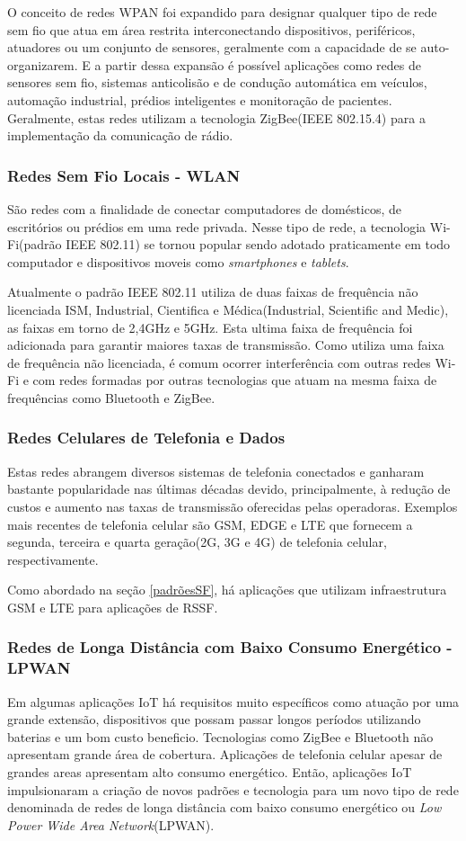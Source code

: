 O conceito de redes WPAN foi expandido para designar qualquer tipo de rede sem fio que atua em área restrita interconectando dispositivos, periféricos, atuadores ou um conjunto de sensores, geralmente com a capacidade de se auto-organizarem. E a partir dessa expansão é possível aplicações como redes de sensores sem fio, sistemas anticolisão e de condução automática em veículos, automação industrial, prédios inteligentes e monitoração de pacientes. Geralmente, estas redes utilizam a tecnologia ZigBee(IEEE 802.15.4) para a implementação da comunicação de rádio.

\subsubsection*{Redes Sem Fio Locais - WLAN}
São redes com a finalidade de conectar computadores de domésticos, de escritórios ou prédios em uma rede privada. Nesse tipo de rede, a tecnologia Wi-Fi(padrão IEEE 802.11) se tornou popular sendo adotado praticamente em todo computador e dispositivos moveis como \emph{smartphones} e \emph{tablets}.

Atualmente o padrão IEEE 802.11 utiliza de duas faixas de frequência não licenciada ISM, Industrial, Cientifica e Médica(Industrial, Scientific and Medic), as faixas em torno de 2,4GHz e 5GHz. Esta ultima faixa de frequência foi adicionada para garantir maiores taxas de transmissão. Como utiliza uma faixa de frequência não licenciada, é comum ocorrer interferência com outras redes Wi-Fi e com redes formadas por outras tecnologias que atuam na mesma faixa de frequências como Bluetooth e ZigBee.

\subsubsection*{Redes Celulares de Telefonia e Dados}
Estas redes abrangem diversos sistemas de telefonia conectados e ganharam bastante popularidade nas últimas décadas devido, principalmente, à redução de custos e aumento nas taxas de transmissão oferecidas pelas operadoras. Exemplos mais recentes de telefonia celular são GSM, EDGE e LTE que fornecem a segunda, terceira e quarta geração(2G, 3G e 4G) de telefonia celular, respectivamente.

Como abordado na seção \ref{padrõesSF}, há aplicações que utilizam infraestrutura GSM e LTE para aplicações de RSSF.


\subsubsection*{Redes de Longa Distância com Baixo Consumo Energético - LPWAN}
Em algumas aplicações IoT há requisitos muito específicos como atuação por uma grande extensão, dispositivos que possam passar longos períodos utilizando baterias e um bom custo beneficio. Tecnologias como ZigBee e Bluetooth não apresentam grande área de cobertura. Aplicações de telefonia celular apesar de grandes areas apresentam alto consumo energético.  Então, aplicações IoT impulsionaram a criação de novos padrões e tecnologia para um novo tipo de rede denominada de redes de longa distância com baixo consumo energético ou \emph{Low Power Wide Area Network}(LPWAN).

